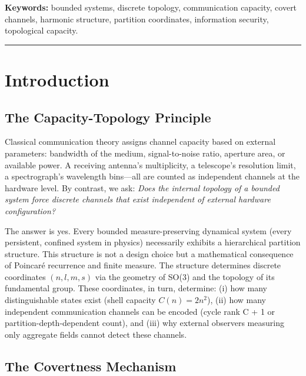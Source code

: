 \documentclass[11pt,twocolumn,a4paper]{article}
\theoremstyle{definition}
\begin{document}
\noindent\textbf{Keywords:} bounded systems, discrete topology, communication capacity, covert channels, harmonic structure, partition coordinates, information security, topological capacity.

\tableofcontents
\vspace{12pt}\hrule\vspace{12pt}

\section{Introduction}
\label{sec:introduction}

\subsection{The Capacity-Topology Principle}

Classical communication theory assigns channel capacity based on external parameters: bandwidth of the medium, signal-to-noise ratio, aperture area, or available power. A receiving antenna's multiplicity, a telescope's resolution limit, a spectrograph's wavelength bins—all are counted as independent channels at the hardware level. By contrast, we ask: \emph{Does the internal topology of a bounded system force discrete channels that exist independent of external hardware configuration?}

The answer is yes. Every bounded measure-preserving dynamical system (every persistent, confined system in physics) necessarily exhibits a hierarchical partition structure. This structure is not a design choice but a mathematical consequence of Poincaré recurrence and finite measure. The structure determines discrete coordinates $(n,l,m,s)$ via the geometry of SO(3) and the topology of its fundamental group. These coordinates, in turn, determine: (i) how many distinguishable states exist (shell capacity $C(n) = 2n^2$), (ii) how many independent communication channels can be encoded (cycle rank C + 1 or partition-depth-dependent count), and (iii) why external observers measuring only aggregate fields cannot detect these channels.

\subsection{The Covertness Mechanism}
\end{document}
